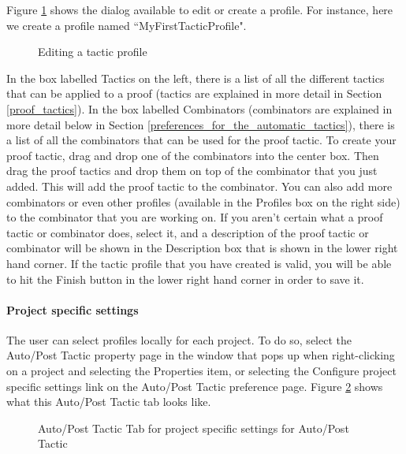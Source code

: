 Figure \ref{fig_ref_01_preferences10} shows the dialog available to edit or create a profile. For instance, here we create a profile named ``MyFirstTacticProfile".
\begin{figure}[!ht]
\begin{center}
	\caption{Editing a tactic profile}
	\label{fig_ref_01_preferences10}
\end{center}
\end{figure}

In the box labelled \textsf{Tactics} on the left, there is a list of all the different tactics that can be applied to a proof (tactics are explained in more detail in Section \ref{proof_tactics}). In the box labelled \textsf{Combinators} (combinators are explained in more detail below in Section \ref{preferences_for_the_automatic_tactics}), there is a list of all the combinators that can be used for the proof tactic. To create your proof tactic, drag and drop one of the combinators into the center box. Then drag the proof tactics and drop them on top of the combinator that you just added. This will add the proof tactic to the combinator. You can also add more combinators or even other profiles (available in the \textsf{Profiles} box on the right side) to the combinator that you are working on. If you aren't certain what a proof tactic or combinator does, select it, and a description of the proof tactic or combinator will be shown in the \textsf{Description} box that is shown in the lower right hand corner. If the tactic profile that you have created is valid, you will be able to hit the \textsf{Finish} button in the lower right hand corner in order to save it.

\paragraph{Project specific settings}

The user can select profiles locally for each project. To do so, select the \textsf{Auto/Post Tactic} property page in the window that pops up when right-clicking on a project and selecting the \textsf{Properties} item, or selecting the \textsf{Configure project specific settings link} on the \textsf{Auto/Post Tactic} preference page. Figure \ref{fig_ref_01_preferences11} shows what this \textsf{Auto/Post Tactic} tab looks like.

\begin{figure}[!ht]
\begin{center}
	\caption{Auto/Post Tactic Tab for project specific settings for Auto/Post Tactic}
	\label{fig_ref_01_preferences11}
\end{center}
\end{figure}

